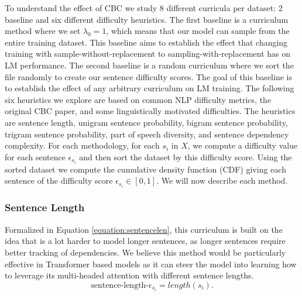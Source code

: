 To understand the effect of CBC we study 8 different curricula per dataset: 2 baseline and six different difficulty heuristics. The first baseline is a curriculum method where we set $\lambda_0 = 1$, which means that our model can sample from the entire training dataset. This baseline aims to establish the effect that changing training with sample-without-replacement to sampling-with-replacement has on LM performance. The second baseline is a random curriculum where we sort the file randomly to create our sentence difficulty scores. The goal of this baseline is to establish the effect of any arbitrary curriculum on LM training. The following six heuristics we explore are based on common NLP difficulty metrics, the original CBC paper, and some linguistically motivated difficulties. The heuristics are sentence length, unigram sentence probability, bigram sentence probability, trigram sentence probability, part of speech diversity, and sentence dependency complexity. For each methodology, for each $s_i$ in $X$, we compute a difficulty value for each sentence $\epsilon_{s_i}$ and then sort the dataset by this difficulty score. Using the sorted dataset we compute the cumulative density function (CDF) giving each sentence of the difficulty score $\epsilon_{s_i} \in [0,1]$. We will now describe each method.
\subsubsection{Sentence Length}
Formalized in Equation \ref{equation:sentencelen}, this curriculum is built on the idea that is a lot harder to model longer sentences, as longer sentences require better tracking of dependencies. We believe this method would be particularly effective in Transformer based models as it can steer the model into learning how to leverage its multi-headed attention with different sentence lengths. \begin{equation}
    \text{sentence-length-}\epsilon_{s_i} = length(s_i).
    \label{equation:sentencelen}
\end{equation} 
